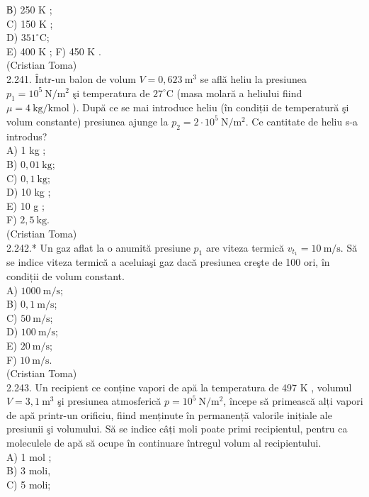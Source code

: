 \documentclass[10pt]{article}
\begin{document}
В) 250 K ;\\
C) 150 K ;\\
D) $351^{\circ} \mathrm{C}$;\\
E) 400 K ; F) 450 K .\\
(Cristian Toma)\\
2.241. Într-un balon de volum $V=0,623 \mathrm{~m}^{3}$ se află heliu la presiunea $p_{1}=10^{5} \mathrm{~N} / \mathrm{m}^{2}$ şi temperatura de $27^{\circ} \mathrm{C}$ (masa molară a heliului fiind\\
$\mu=4 \mathrm{~kg} / \mathrm{kmol}$ ). După ce se mai introduce heliu (în condiții de temperatură şi volum constante) presiunea ajunge la $p_{2}=2 \cdot 10^{5} \mathrm{~N} / \mathrm{m}^{2}$. Ce cantitate de heliu s-a introdus?\\
A) 1 kg ;\\
B) $0,01 \mathrm{~kg}$;\\
C) $0,1 \mathrm{~kg}$;\\
D) 10 kg ;\\
E) 10 g ;\\
F) $2,5 \mathrm{~kg}$.\\
(Cristian Toma)\\
2.242.* Un gaz aflat la o anumită presiune $p_{1}$ are viteza termică $v_{t_{1}}=10 \mathrm{~m} / \mathrm{s}$. Să se indice viteza termică a aceluiaşi gaz dacă presiunea creşte de 100 ori, în condiții de volum constant.\\
A) $1000 \mathrm{~m} / \mathrm{s}$;\\
B) $0,1 \mathrm{~m} / \mathrm{s}$;\\
C) $50 \mathrm{~m} / \mathrm{s}$;\\
D) $100 \mathrm{~m} / \mathrm{s}$;\\
E) $20 \mathrm{~m} / \mathrm{s}$;\\
F) $10 \mathrm{~m} / \mathrm{s}$.\\
(Cristian Toma)\\
2.243. Un recipient ce conține vapori de apă la temperatura de 497 K , volumul $V=3,1 \mathrm{~m}^{3}$ şi presiunea atmosferică $p=10^{5} \mathrm{~N} / \mathrm{m}^{2}$, începe să primească alți vapori de apă printr-un orificiu, fiind menținute în permanență valorile inițiale ale presiunii şi volumului. Să se indice câți moli poate primi recipientul, pentru ca moleculele de apă să ocupe în continuare întregul volum al recipientului.\\
A) 1 mol ;\\
B) 3 moli,\\
C) 5 moli;\\
\end{document}
